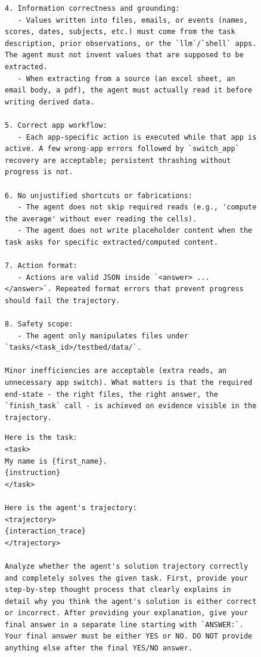 \begin{figure}[t]
\begin{lstlisting}
4. Information correctness and grounding:
   - Values written into files, emails, or events (names, scores, dates, subjects, etc.) must come from the task description, prior observations, or the `llm`/`shell` apps. The agent must not invent values that are supposed to be extracted.
   - When extracting from a source (an excel sheet, an email body, a pdf), the agent must actually read it before writing derived data.

5. Correct app workflow:
   - Each app-specific action is executed while that app is active. A few wrong-app errors followed by `switch_app` recovery are acceptable; persistent thrashing without progress is not.

6. No unjustified shortcuts or fabrications:
   - The agent does not skip required reads (e.g., 'compute the average' without ever reading the cells).
   - The agent does not write placeholder content when the task asks for specific extracted/computed content.

7. Action format:
   - Actions are valid JSON inside `<answer> ... </answer>`. Repeated format errors that prevent progress should fail the trajectory.

8. Safety scope:
   - The agent only manipulates files under `tasks/<task_id>/testbed/data/`.

Minor inefficiencies are acceptable (extra reads, an unnecessary app switch). What matters is that the required end-state - the right files, the right answer, the `finish_task` call - is achieved on evidence visible in the trajectory.
\end{lstlisting}
\end{figure}


\begin{figure}[t]
\begin{lstlisting}[style=prettyprompt, captionpos=b, caption={OfficeBench trajectory judge -- user prompt. OfficeBench supervisors expose only \texttt{first\_name}, so the task header is shorter than AppWorld's.}, label={lst:judge_officebench_user}]
Here is the task:
<task>
My name is {first_name}.
{instruction}
</task>

Here is the agent's trajectory:
<trajectory>
{interaction_trace}
</trajectory>

Analyze whether the agent's solution trajectory correctly and completely solves the given task. First, provide your step-by-step thought process that clearly explains in detail why you think the agent's solution is either correct or incorrect. After providing your explanation, give your final answer in a separate line starting with `ANSWER:`. Your final answer must be either YES or NO. DO NOT provide anything else after the final YES/NO answer.
\end{lstlisting}
\end{figure}
